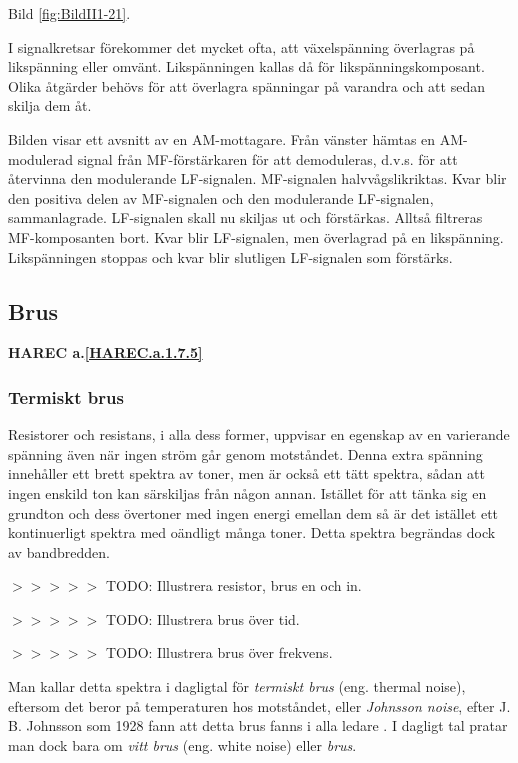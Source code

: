 Bild \ref{fig:BildII1-21}.

I signalkretsar förekommer det mycket ofta, att växelspänning överlagras på
likspänning eller omvänt. Likspänningen kallas då för likspänningskomposant.
Olika åtgärder behövs för att överlagra spänningar på varandra och att sedan
skilja dem åt.

Bilden visar ett avsnitt av en AM-mottagare. Från vänster hämtas en
AM-modulerad signal från MF-förstärkaren för att demoduleras, d.v.s. för att
återvinna den modulerande LF-signalen. MF-signalen halvvågslikriktas. Kvar blir
den positiva delen av MF-signalen och den modulerande LF-signalen,
sammanlagrade. LF-signalen skall nu skiljas ut och förstärkas. Alltså filtreras
MF-komposanten bort. Kvar blir LF-signalen, men överlagrad på en likspänning.
Likspänningen stoppas och kvar blir slutligen LF-signalen som förstärks.

\subsection{Brus}
\textbf{HAREC a.\ref{HAREC.a.1.7.5}\label{myHAREC.a.1.7.5}}

\subsubsection{Termiskt brus}

Resistorer och resistans, i alla dess former, uppvisar en egenskap av
en varierande spänning även när ingen ström går genom motståndet. Denna extra
spänning innehåller ett brett spektra av toner, men är också ett tätt spektra,
sådan att ingen enskild ton kan särskiljas från någon annan. Istället för att
tänka sig en grundton och dess övertoner med ingen energi emellan dem så är det
istället ett kontinuerligt spektra med oändligt många toner. Detta spektra
begrändas dock av bandbredden.

$>>>>>$ TODO: Illustrera resistor, brus en och in.

$>>>>>$ TODO: Illustrera brus över tid.

$>>>>>$ TODO: Illustrera brus över frekvens.

Man kallar detta spektra i dagligtal för \emph{termiskt brus}
(eng. thermal noise), eftersom det beror på temperaturen hos motståndet, eller
\emph{Johnsson noise}, efter J. B. Johnsson som 1928 fann att detta brus fanns
i alla ledare \cite{ott1988}.
I dagligt tal pratar man dock bara om \emph{vitt brus} (eng. white noise) eller
\emph{brus}.

